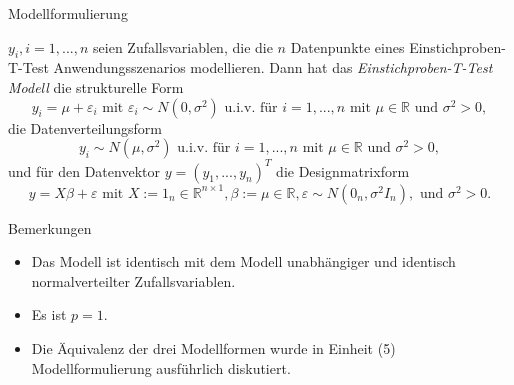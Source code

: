\documentclass[
  8pt,
  ignorenonframetext,
]{beamer}
\providecommand{\tightlist}{%
  \setlength{\itemsep}{0pt}\setlength{\parskip}{0pt}}
\begin{document}
\begin{frame}{Modellformulierung}
\protect\hypertarget{modellformulierung}{}
\footnotesize
\begin{definition}
\justifying
$y_i, i = 1,...,n$ seien Zufallsvariablen, die die $n$ Datenpunkte eines Einstichproben-T-Test
Anwendungsszenarios modellieren. Dann hat das \textit{Einstichproben-T-Test Modell}
die strukturelle Form
\begin{equation}
y_i = \mu + \varepsilon_i
\mbox{ mit }
\varepsilon_i \sim N(0,\sigma^2) \mbox{ u.i.v. für } i = 1,...,n \mbox{ mit } \mu \in \mathbb{R} \mbox{ und } \sigma^2 > 0,
\end{equation}
die Datenverteilungsform
\begin{equation}
y_i \sim  N(\mu,\sigma^2) \mbox{ u.i.v. für } i = 1,...,n \mbox{ mit } \mu \in \mathbb{R} \mbox{ und } \sigma^2 > 0,
\end{equation}
und für den Datenvektor $y = (y_1,...,y_n)^T$ die Designmatrixform
\begin{equation}
y = X\beta + \varepsilon \mbox{ mit }
X := 1_n \in \mathbb{R}^{n \times 1},
\beta := \mu \in \mathbb{R},
\varepsilon \sim N(0_n,\sigma^2I_n),
\mbox{ und }
\sigma^2 > 0.
\end{equation}
\end{definition}

Bemerkungen

\begin{itemize}
\tightlist
\item
  Das Modell ist identisch mit dem Modell unabhängiger und identisch
  normalverteilter Zufallsvariablen.
\item
  Es ist \(p = 1\).
\item
  Die Äquivalenz der drei Modellformen wurde in Einheit (5)
  Modellformulierung ausführlich diskutiert.
\end{itemize}
\end{frame}
\end{document}
